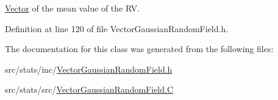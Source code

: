 \hyperlink{class_q_u_e_s_o_1_1_vector}{Vector} of the mean value of the R\-V. 



Definition at line 120 of file Vector\-Gaussian\-Random\-Field.\-h.



The documentation for this class was generated from the following files\-:\begin{DoxyCompactItemize}
\item 
src/stats/inc/\hyperlink{_vector_gaussian_random_field_8h}{Vector\-Gaussian\-Random\-Field.\-h}\item 
src/stats/src/\hyperlink{_vector_gaussian_random_field_8_c}{Vector\-Gaussian\-Random\-Field.\-C}\end{DoxyCompactItemize}
